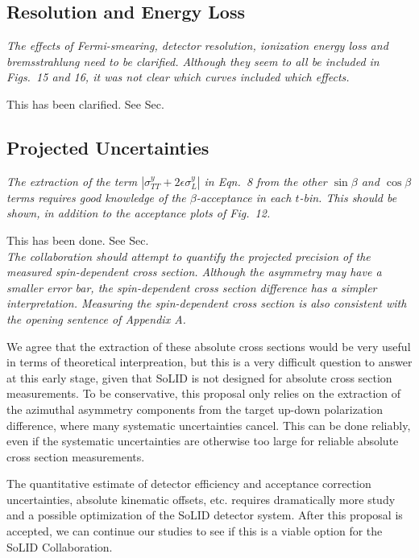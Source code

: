 \subsection{Resolution and Energy Loss}

{\it The effects of Fermi-smearing, detector resolution, ionization energy
  loss and bremsstrahlung need to be clarified.  Although they seem to all be
  included in Figs.~15 and 16, it was not clear which curves included which
  effects.}

This has been clarified.  See Sec.

\subsection{Projected Uncertainties}

{\it The extraction of the term $|\sigma^y_{TT}+2\epsilon\sigma^y_L|$ in
  Eqn.~8 from the other $\sin\beta$ and $\cos\beta$ terms requires good
  knowledge of the $\beta$-acceptance in each $t$-bin.  This should be shown,
  in addition to the acceptance plots of Fig.~12.}

This has been done.  See Sec.
\\[0.2ex]

{\it The collaboration should attempt to quantify the projected precision of
  the measured spin-dependent cross section.  Although the asymmetry may have a
  smaller error bar, the spin-dependent cross section difference has a simpler
  interpretation.  Measuring the spin-dependent cross section is also
  consistent with the opening sentence of Appendix A.}

We agree that the extraction of these absolute cross sections would be very
useful in terms of theoretical interpreation, but this is a very difficult
question to answer at this early stage, given that SoLID is not designed for
absolute cross section measurements.  To be conservative, this proposal only
relies on the extraction of the azimuthal asymmetry components from the target
up-down polarization difference, where many systematic uncertainties cancel.
This can be done reliably, even if the systematic uncertainties are otherwise
too large for reliable absolute cross section measurements.

The quantitative estimate of detector efficiency and acceptance correction
uncertainties, absolute kinematic offsets, etc. requires dramatically more
study and a possible optimization of the SoLID detector system.  After this
proposal is accepted, we can continue our studies to see if this is a viable
option for the SoLID Collaboration.

